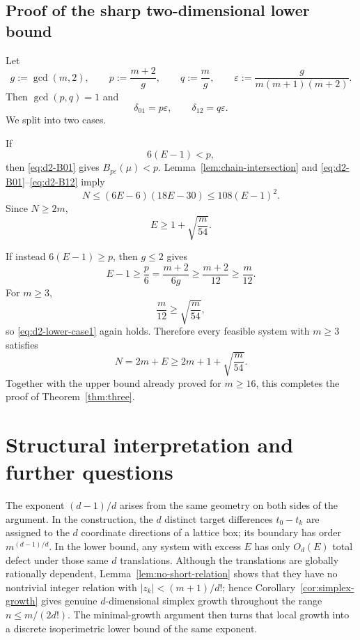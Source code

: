 \documentclass[11pt]{article}
\theoremstyle{definition}
\newcommand{\1}{\mathbf{1}}
\begin{document}
\subsection{Proof of the sharp two-dimensional lower bound}

Let
\begin{equation}\label{eq:d2-pqe}
  g:=\gcd(m,2),
  \qquad
  p:=\frac{m+2}{g},
  \qquad
  q:=\frac{m}{g},
  \qquad
  \varepsilon:=\frac{g}{m(m+1)(m+2)}.
\end{equation}
Then $\gcd(p,q)=1$ and
\[
  \delta_{01}=p\varepsilon,
  \qquad
  \delta_{12}=q\varepsilon.
\]
We split into two cases.

If
\begin{equation}\label{eq:d2-case1}
  6(E-1)<p,
\end{equation}
then \eqref{eq:d2-B01} gives $B_{p\varepsilon}(\mu)<p$.  Lemma~\ref{lem:chain-intersection} and \eqref{eq:d2-B01}--\eqref{eq:d2-B12} imply
\[
  N\le(6E-6)(18E-30)\le108(E-1)^2.
\]
Since $N\ge2m$,
\begin{equation}\label{eq:d2-lower-case1}
  E\ge1+\sqrt{\frac{m}{54}}.
\end{equation}

If instead $6(E-1)\ge p$, then $g\le2$ gives
\[
  E-1\ge\frac p6
  =\frac{m+2}{6g}
  \ge\frac{m+2}{12}
  \ge\frac m{12}.
\]
For $m\ge3$,
\[
  \frac m{12}\ge\sqrt{\frac m{54}},
\]
so \eqref{eq:d2-lower-case1} again holds.  Therefore every feasible system with $m\ge3$ satisfies
\[
  N=2m+E\ge2m+1+\sqrt{\frac m{54}}.
\]
Together with the upper bound already proved for $m\ge16$, this completes the proof of Theorem~\ref{thm:three}.

\section{Structural interpretation and further questions}

The exponent $(d-1)/d$ arises from the same geometry on both sides of the argument.  In the construction, the $d$ distinct target differences $t_0-t_k$ are assigned to the $d$ coordinate directions of a lattice box; its boundary has order $m^{(d-1)/d}$.  In the lower bound, any system with excess $E$ has only $O_d(E)$ total defect under those same $d$ translations.  Although the translations are globally rationally dependent, Lemma~\ref{lem:no-short-relation} shows that they have no nontrivial integer relation with $|z_k|<(m+1)/d!$; hence Corollary~\ref{cor:simplex-growth} gives genuine $d$-dimensional simplex growth throughout the range $n\le m/(2d!)$.  The minimal-growth argument then turns that local growth into a discrete isoperimetric lower bound of the same exponent.
\end{document}
